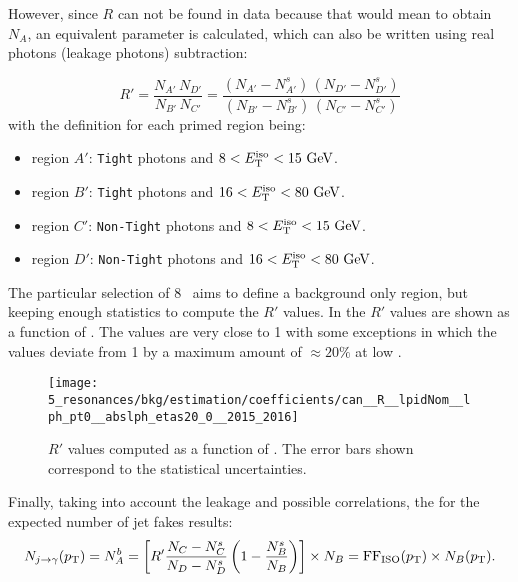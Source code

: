 However, since \(R\) can not be found in data because that would mean to obtain \(N_A\), an equivalent parameter is calculated, which can also be written using real photons (leakage photons) subtraction:

\begin{equation*}
    R' = \frac{N_{A'}\,N_{D'}}{N_{B'}\,N_{C'}} = \frac{(N_{A'} - N^{s}_{A'})\,(N_{D'}-N^s_{D'})}{(N_{B'}-N^s_{B'})\,(N_{C'}-N^s_{C'})}
\end{equation*}
with the definition for each primed region being:
\begin{itemize}
    \item region \(A'\): \texttt{Tight} photons and \(8 < E_{\text{T}}^{\text{iso}} < 15~ \text{GeV}\).
    \item region \(B'\): \texttt{Tight} photons and \(16 < E_{\text{T}}^{\text{iso}} < 80~ \text{GeV}\).
    \item region \(C'\): \texttt{Non-Tight} photons and \(8 < E_{\text{T}}^{\text{iso}} < 15~ \text{GeV}\).
    \item region \(D'\): \texttt{Non-Tight} photons and \(16 < E_{\text{T}}^{\text{iso}} < 80~ \text{GeV}\).
\end{itemize}


The particular selection of 8 \gev\ aims to define a background only region, but keeping enough statistics to compute the \(R'\) values. In \Fig{\ref{fig:bkg:estimation:abcd_corrections:rprime}} the \(R'\) values are shown as a function of \ptgam.
The values are very close to 1 with some exceptions in which the values deviate from 1 by a maximum amount of \(\approx 20\%\) at low \ptgam.
\begin{figure}[htbp]
    \centering
    \texttt{[image: 5\_resonances/bkg/estimation/coefficients/can\_\_R\_\_lpidNom\_\_lph\_pt0\_\_abslph\_etas20\_0\_\_2015\_2016]}
    \caption{\(R'\) values computed as a function of \ptgam. The error bars shown correspond to the statistical uncertainties.}
    \label{fig:bkg:estimation:abcd_corrections:rprime}
\end{figure}



Finally, taking into account the leakage and possible correlations, the \Eqn{\ref{eq:bkg:estimation:abcd_corrections:njfakes_leak}} for the expected number of jet fakes results:
\begin{equation}
    \label{eq:bkg:estimation:abcd_corrections_ffiso}
    N_{j\rightarrow\gamma}(p_{\text{T}}) =
    N^{b}_{A} =
    \left[R'  \frac{N_{C}-N^{s}_{C}}{N_{D}-N^{s}_{D}}  \left(1 - \frac{N^{s}_{B}}{N_{B}} \right)\right] \times N_B = \text{FF}_{\text{ISO}}(p_{\text{T}})  \times  N_{B}(p_{\text{T}}).
\end{equation}

